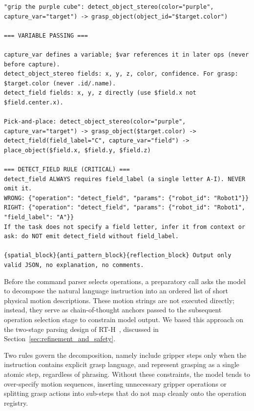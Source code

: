 \begin{lstlisting}[caption={The few-shot and rule-based system prompt for the command parser.}, extendedchars=true]
"grip the purple cube": detect_object_stereo(color="purple", capture_var="target") -> grasp_object(object_id="$target.color")

=== VARIABLE PASSING ===

capture_var defines a variable; $var references it in later ops (never before capture).
detect_object_stereo fields: x, y, z, color, confidence. For grasp: $target.color (never .id/.name).
detect_field fields: x, y, z directly (use $field.x not $field.center.x).

Pick-and-place: detect_object_stereo(color="purple", capture_var="target") -> grasp_object($target.color) -> detect_field(field_label="C", capture_var="field") -> place_object($field.x, $field.y, $field.z)

=== DETECT_FIELD RULE (CRITICAL) ===
detect_field ALWAYS requires field_label (a single letter A-I). NEVER omit it.
WRONG: {"operation": "detect_field", "params": {"robot_id": "Robot1"}}
RIGHT: {"operation": "detect_field", "params": {"robot_id": "Robot1", "field_label": "A"}}
If the task does not specify a field letter, infer it from context or ask: do NOT emit detect_field without field_label.

{spatial_block}{anti_pattern_block}{reflection_block} Output only valid JSON, no explanation, no comments.
\end{lstlisting}

Before the command parser selects operations, a preparatory call asks the model to decompose the natural language instruction into an ordered list of short physical motion descriptions. These motion strings are not executed directly; instead, they serve as chain-of-thought anchors passed to the subsequent operation selection stage to constrain model output. We based this approach on the two-stage parsing design of RT-H~\cite{belkhale2024rthactionhierarchiesusing}, discussed in Section~\ref{sec:refinement_and_safety}.

Two rules govern the decomposition, namely include gripper steps only when the instruction contains explicit grasp language, and represent grasping as a single atomic step, regardless of phrasing. Without these constraints, the model tends to over-specify motion sequences, inserting unnecessary gripper operations or splitting grasp actions into sub-steps that do not map cleanly onto the operation registry.

